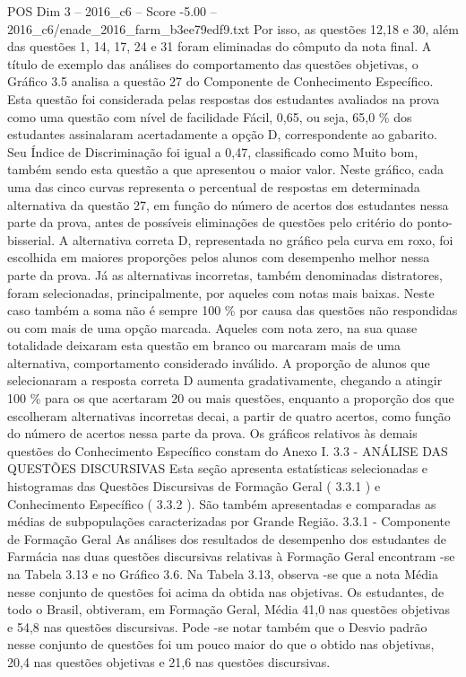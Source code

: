\begin{textsample}{POS Dim 3 – 2016\_c6 – Score -5.00 – 2016\_c6/enade\_2016\_farm\_b3ee79edf9.txt}
Por isso, as questões 12,18 e 30, além das questões 1, 14, 17, 24 e 31 foram eliminadas do cômputo da nota final.
A título de exemplo das análises do comportamento das questões objetivas, o Gráfico 3.5 analisa a questão 27 do Componente de Conhecimento Específico.
Esta questão foi considerada pelas respostas dos estudantes avaliados na prova como uma questão com nível de facilidade Fácil, 0,65, ou seja, 65,0 \% dos estudantes assinalaram acertadamente a opção D, correspondente ao gabarito.
Seu Índice de Discriminação foi igual a 0,47, classificado como Muito bom, também sendo esta questão a que apresentou o maior valor.
Neste gráfico, cada uma das cinco curvas representa o percentual de respostas em determinada alternativa da questão 27, em função do número de acertos dos estudantes nessa parte da prova, antes de possíveis eliminações de questões pelo critério do ponto-bisserial.
A alternativa correta D, representada no gráfico pela curva em roxo, foi escolhida em maiores proporções pelos alunos com desempenho melhor nessa parte da prova.
Já as alternativas incorretas, também denominadas distratores, foram selecionadas, principalmente, por aqueles com notas mais baixas.
Neste caso também a soma não é sempre 100 \% por causa das questões não respondidas ou com mais de uma opção marcada.
Aqueles com nota zero, na sua quase totalidade deixaram esta questão em branco ou marcaram mais de uma alternativa, comportamento considerado inválido.
A proporção de alunos que selecionaram a resposta correta D aumenta gradativamente, chegando a atingir 100 \% para os que acertaram 20 ou mais questões, enquanto a proporção dos que escolheram alternativas incorretas decai, a partir de quatro acertos, como função do número de acertos nessa parte da prova.
Os gráficos relativos às demais questões do Conhecimento Específico constam do Anexo I. 3.3 - ANÁLISE DAS QUESTÕES DISCURSIVAS Esta seção apresenta estatísticas selecionadas e histogramas das Questões Discursivas de Formação Geral ( 3.3.1 ) e Conhecimento Específico ( 3.3.2 ).
São também apresentadas e comparadas as médias de subpopulações caracterizadas por Grande Região. 3.3.1 - Componente de Formação Geral As análises dos resultados de desempenho dos estudantes de Farmácia nas duas questões discursivas relativas à Formação Geral encontram -se na Tabela 3.13 e no Gráfico 3.6.
Na Tabela 3.13, observa -se que a nota Média nesse conjunto de questões foi acima da obtida nas objetivas.
Os estudantes, de todo o Brasil, obtiveram, em Formação Geral, Média 41,0 nas questões objetivas e 54,8 nas questões discursivas.
Pode -se notar também que o Desvio padrão nesse conjunto de questões foi um pouco maior do que o obtido nas objetivas, 20,4 nas questões objetivas e 21,6 nas questões discursivas.

\end{textsample}
